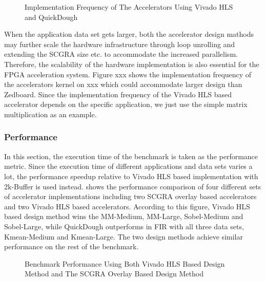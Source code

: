 \begin{figure}[H]
\caption{Implementation Frequency of The Accelerators Using Vivado HLS and QuickDough}
\label{fig:impl-freq}
\end{figure}

When the application data set gets larger, both the accelerator design mathods may further scale the hardware infrastructure through loop unrolling and extending the SCGRA size etc. to accommodate the increased parallelism. Therefore, the scalability of the hardware implementation is also essential for the FPGA acceleration system. Figure xxx shows the implementation frequency of the accelerators kernel on xxx which could accommodate larger design than Zedboard. Since the implementation frequency of the Vivado HLS based accelerator depends on the specific application, we just use the simple matrix multiplication as an example. 

\subsubsection{Performance}
In this section, the execution time of the benchmark is taken as the performance metric. Since the execution time of different applications and data sets varies a lot, the performance speedup relative to Vivado HLS based implementation with 2k-Buffer is used instead.  shows the performance comparison of four different sets of accelerator implementations including two SCGRA overlay based accelerators and two Vivado HLS based accelerators. According to this figure, Vivado HLS based design method wins the MM-Medium, MM-Large, Sobel-Medium and Sobel-Large, while QuickDough outperforms in FIR with all three data sets, Kmean-Medium and Kmean-Large. The two design methods achieve similar performance on the rest of the benchmark. 

\begin{figure}[H]
\caption{Benchmark Performance Using Both Vivado HLS Based Design Method and The SCGRA Overlay Based Design Method}
\label{fig:real-perf}
\end{figure}

